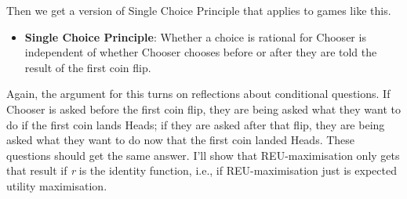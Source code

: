 \documentclass[
  12pt,
  letterpaper,
  DIV=11,
  numbers=noendperiod]{scrreprt}
\providecommand{\tightlist}{%
  \setlength{\itemsep}{0pt}\setlength{\parskip}{0pt}}\usepackage{longtable,booktabs,array}
\begin{document}
\begin{table}

\caption{\label{tbl-general-coin-exit}The abstract form of an exit
problem with coins.}

\begin{minipage}[t]{0.50\linewidth}



\end{minipage}%
%
\begin{minipage}[t]{0.50\linewidth}



\end{minipage}%

\end{table}%

Then we get a version of Single Choice Principle that applies to games
like this.

\begin{itemize}
\tightlist
\item
  \textbf{Single Choice Principle}: Whether a choice is rational for
  Chooser is independent of whether Chooser chooses before or after they
  are told the result of the first coin flip.
\end{itemize}

Again, the argument for this turns on reflections about conditional
questions. If Chooser is asked before the first coin flip, they are
being asked what they want to do if the first coin lands Heads; if they
are asked after that flip, they are being asked what they want to do now
that the first coin landed Heads. These questions should get the same
answer. I'll show that REU-maximisation only gets that result if
\emph{r} is the identity function, i.e., if REU-maximisation just is
expected utility maximisation.
\end{document}
